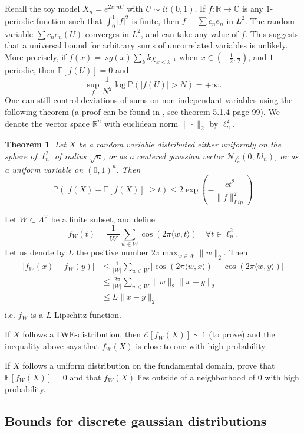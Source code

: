 \documentclass{article}
\newtheorem{theorem}{Theorem}
\begin{document}
Recall the toy model $X_n = e^{2i\pi nU}$ with $U\sim \mathcal U(0,1)$. If $f : \mathbb R \rightarrow \mathbb C$ is any $1$-periodic function such that $\int_0^1 |f|^2$ is finite, then $f = \sum c_n e_n $ in $L^2$. The random variable $\sum c_n e_n(U)$ converges in $L^2$, and can take any value of $f$. This suggests that a universal bound for arbitrary sums of uncorrelated variables is unlikely. More precisely, if $f(x) = \ sg(x)\sum_k k \chi_{x < k^{-1} } $ when $x\in (-\frac{1}{2},\frac{1}{2})$, and $1$ periodic, then $\mathbb E[f(U)] = 0$ and 
$$\sup_f \frac{1}{N^2}\log \mathbb P(|f(U)| > N) = +\infty .$$ 
One can still control deviations of sums on non-independant variables using the following theorem (a proof can be found in \cite{vershynin2018high}, see theorem 5.1.4 page 99). We denote the vector space $\mathbb R^n$ with euclidean norm $\|\cdot\|_2$ by $\ell^2_n$.

\begin{theorem}
Let $X$ be a random variable distributed either uniformly on the sphere of $\ell^2_n$ of radius $\sqrt n$, or as a centered gaussian vector $\mathcal N_{\ell^2_n}(0, Id_n)$, or as a uniform variable on $(0,1)^n$. Then 
$$ \mathbb  P\left(|f(X) -\mathbb E[f(X)]| \geq t\right) \leq 2\exp{\left(-\frac{ct^2}{\|f\|^2_{Lip}} \right)}$$
\end{theorem}

Let $W\subset \Lambda^\vee$ be a finite subset, and define 
$$f_W(t) = \frac{1}{|W|}\sum_{w\in W} \cos(2\pi \langle w , t \rangle) \quad \forall t \in \ell^2_n.$$
Let us denote by $L$ the positive number $2\pi\max_{w\in W} \|w\|_2$. Then
\[\begin{split}
|f_W(x) -f_W(y)| & \leq \frac{1}{|W|}\sum_{w\in W} |\cos(2\pi \langle w , x \rangle ) -\cos(2\pi \langle w , y \rangle) | \\
		 & \leq \frac{2\pi}{|W|}\sum_{w\in W} \|w\|_2 \|x-y\|_2\\
		 & \leq L\|x-y\|_2\\ 
\end{split}\]
i.e. $f_W$ is a $L$-Lipschitz function.  

If $X$ follows a LWE-distribution, then $\mathcal E[f_W(X)] \sim 1$ (to prove) and the inequality above says that $f_W(X)$ is close to one with high probability.

If $X$ follows a uniform distribution on the fundamental domain, prove that $\mathbb E[f_W(X)]= 0$ and that $f_W(X)$ lies outside of a neighborhood of $0$ with high probability.

\subsection{Bounds for discrete gaussian distributions}
\end{document}
